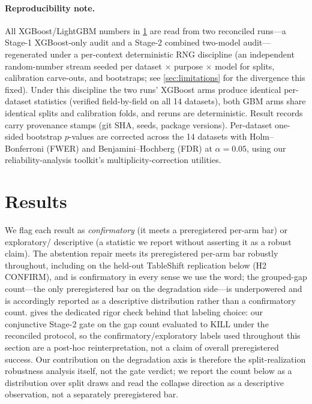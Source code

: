 \documentclass[11pt]{article}
\begin{document}
\paragraph{Reproducibility note.} All XGBoost/LightGBM numbers in \cref{sec:results} are read from two
reconciled runs---a Stage-1 XGBoost-only audit and a Stage-2 combined two-model audit---regenerated under a
per-context deterministic RNG discipline (an independent random-number stream seeded per dataset
$\times$ purpose $\times$ model for splits, calibration carve-outs, and bootstraps; see \cref{sec:limitations} for
the divergence this fixed). Under this discipline the two runs' XGBoost arms produce identical
per-dataset statistics (verified field-by-field on all 14 datasets), both GBM arms share identical
splits and calibration folds, and reruns are deterministic. Result records carry provenance stamps
(git SHA, seeds, package versions). Per-dataset one-sided bootstrap $p$-values are corrected across the
14 datasets with Holm--Bonferroni (FWER) and Benjamini--Hochberg (FDR) at $\alpha=0.05$, using our
reliability-analysis toolkit's multiplicity-correction utilities.

\section{Results}\label{sec:results}
We flag each result as \emph{confirmatory} (it meets a preregistered per-arm bar) or exploratory/
descriptive (a statistic we report without asserting it as a robust claim). The abstention repair meets its
preregistered per-arm bar robustly throughout, including on the held-out TableShift replication below (H2
CONFIRM), and is confirmatory in every sense we use the word; the grouped-gap count---the only preregistered
bar on the degradation side---is underpowered and is accordingly reported as a descriptive distribution
rather than a confirmatory count.  gives the dedicated rigor check behind that
labeling choice: our conjunctive Stage-2 gate on the gap count evaluated to KILL under the reconciled
protocol, so the confirmatory/exploratory labels used throughout this section are a post-hoc
reinterpretation, not a claim of overall preregistered success. Our contribution on the degradation axis is
therefore the split-realization robustness analysis itself, not the gate verdict; we report the count below
as a distribution over split draws and read the collapse direction as a descriptive observation, not a
separately preregistered bar.
\end{document}
